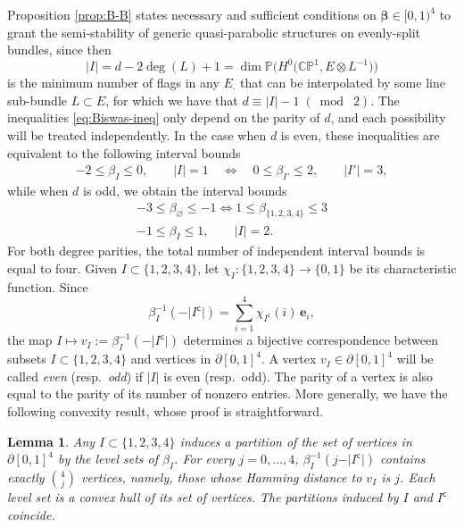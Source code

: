 \documentclass[10pt,a4paper]{amsart}
\newcommand{\field}[1]{\ensuremath{\mathbb{#1}}}
\newcommand{\CC}{\field{C}}
\newcommand{\PP}{\field{P}}
\newcommand{\qp}{\boldsymbol{\cdot}}
\numberwithin{equation}{section}
\newtheorem{Lemma}[Theorem]{Lemma}
\begin{document}
Proposition \ref{prop:B-B} states necessary and sufficient conditions on $\pmb{\beta}\in[0,1)^{4}$ to grant the semi-stability of generic quasi-parabolic structures on evenly-split bundles, since then
\[
\vert I\vert = d-2\deg(L)+1 = \dim \PP\bigl(H^{0}\big(\CC\PP^{1},E\otimes L^{-1}\big)\bigr)
\]
is the minimum number of flags in any $E_{\qp}$ that can be interpolated by some line sub-bundle $L\subset E$, for which we have that $d \equiv \vert I\vert -1\; (\bmod\; 2)$.
The inequalities \eqref{eq:Biswas-ineq} only depend on the parity of $d$, and each possibility will be treated independently. In the case when $d$ is even, these inequalities are equivalent to the following
interval bounds
\begin{gather}\label{eq:bound1}
-2\leq\beta_{I} \leq 0, \qquad \vert I\vert=1\quad \Leftrightarrow\quad 0\leq\beta_{I'} \leq 2, \qquad \vert I'\vert=3,
\end{gather}
while when $d$ is odd, we obtain the interval bounds
\begin{gather}\label{eq:bound2}
-3 \leq\beta_{\varnothing }\leq -1\Leftrightarrow 1 \leq \beta_{\{1,2,3,4\}} \leq 3
\\ \label{eq:bound3}
-1 \leq \beta_{I} \leq 1,\qquad \vert I\vert=2.
\end{gather}
For both degree parities, the total number of independent interval bounds is equal to four.
Given $I\subset \{1,2,3,4\}$, let $\chi_{I}\colon \{1,2,3,4\}\rightarrow\{0,1\}$ be its characteristic function. Since
\[
\beta_{I}^{-1}(-\vert I^{\mathsf{c}}\vert) = \sum_{i=1}^{4}\chi_{I^{\mathsf{c}}}(i)\,\mathbf{e}_{i},
\]
the map $I\mapsto v_{I}:=\beta^{-1}_{I}(-\vert I^{\mathsf{c}}\vert)$ determines a bijective correspondence between subsets $I\subset \{1,2,3,4\}$ and vertices in $\partial [0,1]^{4}$. A vertex $v_{I}\in
\partial[0,1]^{4}$ will be called \emph{even} (resp.~\emph{odd}) if $\vert I\vert$ is even (resp.~odd). The parity of a vertex is also equal to the parity of its number of nonzero entries. More generally, we have the following convexity result, whose proof is straightforward.

\begin{Lemma}\label{lemma:level-set}
Any $I\subset \{1,2,3,4\}$ induces a partition of the set of vertices in $\partial [0,1]^{4}$ by the level sets of $\beta_{I}$. For every $j=0,\dots,4$, $\beta_{I}^{-1}(j - \vert I^{\mathsf{c}}\vert)$ contains exactly ${4\choose j}$ vertices, namely, those whose Hamming distance to $v_{I}$ is $j$. Each level set is a convex hull of its set of vertices. The partitions induced by $I$ and $I^{\mathsf{c}}$ coincide.
\end{Lemma}
\end{document}
